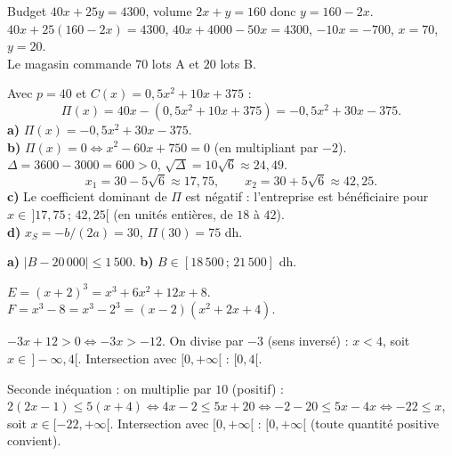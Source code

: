 \documentclass[12pt,a4paper]{article}
\begin{document}
\begin{corrigebox}
Budget $40x+25y=4300$, volume $2x+y=160$ donc $y=160-2x$.\\
$40x+25(160-2x)=4300$, $40x+4000-50x=4300$, $-10x=-700$, $x=70$, $y=20$.\\
Le magasin commande $70$ lots A et $20$ lots B.
\end{corrigebox}

\begin{corrigebox}[En classe -- Profit, seuils et maximum ($p=40$)]
Avec $p=40$ et $C(x)=0{,}5x^2+10x+375$ :
$$\Pi(x) = 40x - (0{,}5x^2+10x+375) = -0{,}5x^2+30x-375.$$
\textbf{a)} $\Pi(x) = -0{,}5x^2+30x-375$.\\
\textbf{b)} $\Pi(x)=0 \Leftrightarrow x^2-60x+750=0$ (en multipliant par $-2$). $\Delta = 3600-3000=600>0$, $\sqrt{\Delta}=10\sqrt{6}\approx 24{,}49$.
$$x_1 = 30-5\sqrt{6}\approx 17{,}75, \qquad x_2 = 30+5\sqrt{6}\approx 42{,}25.$$
\textbf{c)} Le coefficient dominant de $\Pi$ est négatif : l'entreprise est bénéficiaire pour $x \in \,]17{,}75\,;\,42{,}25[$ (en unités entières, de $18$ à $42$).\\
\textbf{d)} $x_S=-b/(2a)=30$, $\Pi(30)=75$ dh.
\end{corrigebox}

\begin{corrigebox}
\textbf{a)} $|B - 20\,000| \leqslant 1\,500$. \quad
\textbf{b)} $B \in [18\,500\,;\,21\,500]$ dh.
\end{corrigebox}

\begin{corrigebox}
$E=(x+2)^3=x^3+6x^2+12x+8$.\\
$F=x^3-8=x^3-2^3=(x-2)(x^2+2x+4)$.
\end{corrigebox}

\begin{corrigebox}
$-3x+12>0 \Leftrightarrow -3x>-12$. On divise par $-3$ (sens inversé) : $x<4$, soit $x\in\,]-\infty,4[$. Intersection avec $[0,+\infty[$ : $[0,4[$.

Seconde inéquation : on multiplie par $10$ (positif) :
$2(2x-1) \leqslant 5(x+4) \Leftrightarrow 4x-2 \leqslant 5x+20 \Leftrightarrow -2-20\leqslant 5x-4x \Leftrightarrow -22\leqslant x$,
soit $x\in[-22,+\infty[$. Intersection avec $[0,+\infty[$ : $[0,+\infty[$ (toute quantité positive convient).
\end{corrigebox}
\end{document}
